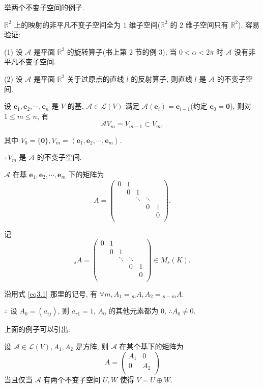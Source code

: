 \documentclass[color=black,device=normal,lang=cn,mode=geye]{elegantnote}
\begin{document}
举两个不变子空间的例子.
\begin{example}
    $\mathbb{R}^2$ 上的映射的非平凡不变子空间全为 $1$ 维子空间($\mathbb{R}^2$ 的 $2$ 维子空间只有 $\mathbb{R}^2$). 容易验证:
    
    (1) 设 $\mathcal{A}$ 是平面 $\mathbb{R}^2$ 的旋转算子(书上第 2 节的例 3), 当 $0<\alpha<2\pi$ 时 $\mathcal{A}$ 没有非平凡不变子空间.

    (2) 设 $\mathcal{A}$ 是平面 $\mathbb{R}^2$ 关于过原点的直线 $l$ 的反射算子, 则直线 $l$ 是 $\mathcal{A}$ 的不变子空间.
\end{example}
\begin{example}\label{exa3.2}
    设 $\boldsymbol{e}_1,\boldsymbol{e}_2,\cdots,\boldsymbol{e}_n$ 是 $V$ 的基, $\mathcal{A}\in\mathcal{L}(V)$ 满足 $\mathcal{A}(\boldsymbol{e}_i)=\boldsymbol{e}_{i-1}$(约定 $\boldsymbol{e}_0=\boldsymbol{0}$), 则对 $1\leq m\leq n$, 有
    \[\mathcal{A}V_m=V_{m-1}\subset V_m,\]

    其中 $V_0=\{\boldsymbol{0}\},V_m=\left<\boldsymbol{e}_1,\boldsymbol{e}_2,\cdots,\boldsymbol{e}_m\right>$.

    $\therefore V_m$ 是 $\mathcal{A}$ 的不变子空间.

    $\mathcal{A}$ 在基 $\boldsymbol{e}_1,\boldsymbol{e}_2,\cdots,\boldsymbol{e}_m$ 下的矩阵为
    \[A=\begin{pmatrix}
        0 & 1 \\
        & 0 & 1 \\
        && \ddots & \ddots \\
        &&& 0 & 1 \\
        &&&& 0 \\
    \end{pmatrix}.\]

    记
    \[{}_{s}A=\begin{pmatrix}
        0 & 1 \\
        & 0 & 1 \\
        && \ddots & \ddots \\
        &&& 0 & 1 \\
        &&&& 0 \\
    \end{pmatrix}\in M_s(K).\]

    沿用式 \ref{eq3.1} 那里的记号, 有 $\forall m,A_1={}_{m}A,A_2={}_{n-m}A$.

    $\therefore$ 设 $A_0=(a_{ij})$, 则 $a_{r1}=1$, $A_0$ 的其他元素都为 $0$, $\therefore A_0\neq0$.
\end{example}
上面的例子可以引出:
\begin{theorem}[书上的定理 2]
    设 $\mathcal{A}\in\mathcal{L}(V),A_1,A_2$ 是方阵, 则 $\mathcal{A}$ 在某个基下的矩阵为
    \[A=\begin{pmatrix}
        A_1 & 0 \\
        0 & A_2 \\
    \end{pmatrix}\]
    当且仅当 $\mathcal{A}$ 有两个不变子空间 $U,W$ 使得 $V=U\oplus W$.
\end{theorem}
\end{document}
